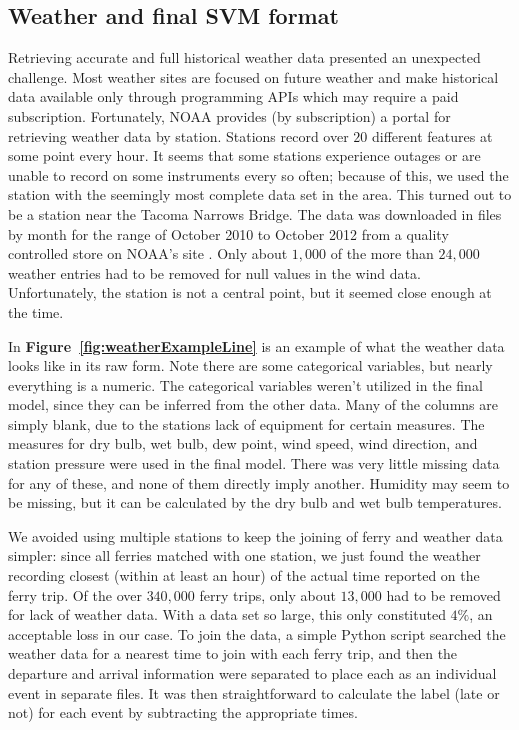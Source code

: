 \documentclass[11pt]{article} %
\begin{document}
\subsection{Weather and final SVM format}
\label{sec:data_origins}
Retrieving accurate and full historical weather data presented an unexpected 
challenge. Most weather sites are focused on future weather and make historical
data available only through programming APIs which may require a paid subscription.
Fortunately, NOAA provides (by subscription) a portal for retrieving weather data
by station. Stations record over $20$ different features at some point every hour.
It seems that some stations experience outages or are unable to record on some
instruments every so often; because of this, we used the station with the seemingly
most complete data set in the area. This turned out to be a station near the 
Tacoma Narrows Bridge. The data was downloaded in files by month for the range of
October 2010 to October 2012 from a quality controlled store on NOAA's 
site \cite{noaaWeather}. Only about $1,000$ of the more than $24,000$ weather 
entries had to be removed for null values in the wind data.  Unfortunately, 
the station is not a central point, but it seemed close enough at the time. 

In \textbf{Figure~\ref{fig:weatherExampleLine}} is an example of what the weather
data looks like in its raw form. Note there are some categorical variables, but
nearly everything is a numeric. The categorical variables weren't utilized in the
final model, since they can be inferred from the other data. Many of the columns
are simply blank, due to the stations lack of equipment for certain measures. 
The measures for dry bulb, wet bulb, dew point, wind speed, wind direction, and
station pressure were used in the final model. There was very little missing data
for any of these, and none of them directly imply another. Humidity may seem to 
be missing, but it can be calculated by the dry bulb and wet bulb temperatures.

We avoided using multiple stations to keep the joining of ferry and weather 
data simpler: since all ferries matched with one station, we just found the 
weather recording closest (within at least an hour) of the actual time reported
on the ferry trip. Of the over $340,000$ ferry trips, only about $13,000$ had to 
be removed for lack of weather data.  With a data set so large, this only 
constituted $4\%$, an acceptable loss in our case. To join the data, a simple
Python script searched the weather data for a nearest time to join with each
ferry trip, and then the departure and arrival information were separated to
place each as an individual event in separate files. It was then straightforward
to calculate the label (late or not) for each event by subtracting the appropriate
times.
\end{document}
